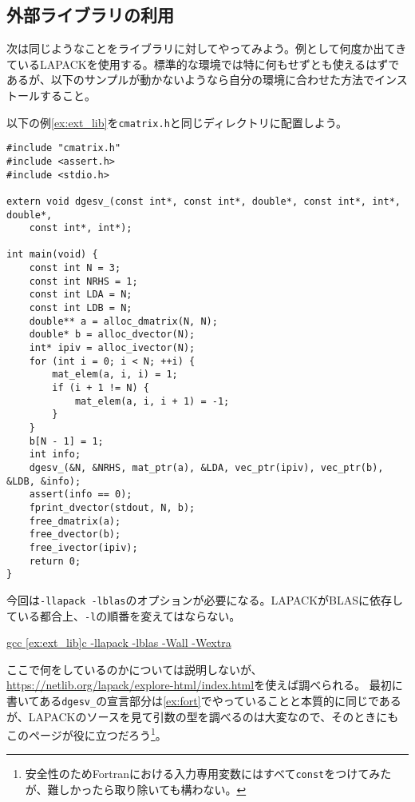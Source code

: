 \subsection{外部ライブラリの利用}
次は同じようなことをライブラリに対してやってみよう。例として何度か出てきているLAPACKを使用する。標準的な環境では特に何もせずとも使えるはずであるが、以下のサンプルが動かないようなら自分の環境に合わせた方法でインストールすること。

以下の例\ref{ex:ext_lib}を\texttt{cmatrix.h}と同じディレクトリに配置しよう。

\begin{reidai}\label{ex:ext_lib}
    \begin{verbatim}
#include "cmatrix.h"
#include <assert.h>
#include <stdio.h>

extern void dgesv_(const int*, const int*, double*, const int*, int*, double*,
    const int*, int*);

int main(void) {
    const int N = 3;
    const int NRHS = 1;
    const int LDA = N;
    const int LDB = N;
    double** a = alloc_dmatrix(N, N);
    double* b = alloc_dvector(N);
    int* ipiv = alloc_ivector(N);
    for (int i = 0; i < N; ++i) {
        mat_elem(a, i, i) = 1;
        if (i + 1 != N) {
            mat_elem(a, i, i + 1) = -1;
        }
    }
    b[N - 1] = 1;
    int info;
    dgesv_(&N, &NRHS, mat_ptr(a), &LDA, vec_ptr(ipiv), vec_ptr(b), &LDB, &info);
    assert(info == 0);
    fprint_dvector(stdout, N, b);
    free_dmatrix(a);
    free_dvector(b);
    free_ivector(ipiv);
    return 0;
}
\end{verbatim}
\end{reidai}
今回は\texttt{-llapack -lblas}のオプションが必要になる。LAPACKがBLASに依存している都合上、\texttt{-l}の順番を変えてはならない。

\begin{commandline2}
    \prompt \underline{gcc \ref{ex:ext_lib}c -llapack -lblas -Wall -Wextra}
\end{commandline2} \noindent

ここで何をしているのかについては説明しないが、\url{https://netlib.org/lapack/explore-html/index.html}を使えば調べられる。
最初に書いてある\texttt{dgesv\_}の宣言部分は\ref{ex:fort}でやっていることと本質的に同じであるが、LAPACKのソースを見て引数の型を調べるのは大変なので、そのときにもこのページが役に立つだろう\footnote{安全性のためFortranにおける入力専用変数にはすべて\texttt{const}をつけてみたが、難しかったら取り除いても構わない。}。

